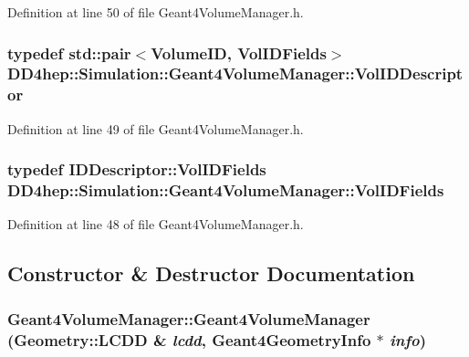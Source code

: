 Definition at line 50 of file Geant4VolumeManager.h.\hypertarget{class_d_d4hep_1_1_simulation_1_1_geant4_volume_manager_aeedd11a516f671331ec2a46f5d39768d}{
\subsubsection[{VolIDDescriptor}]{\setlength{\rightskip}{0pt plus 5cm}typedef std::pair$<$VolumeID, {\bf VolIDFields}$>$ {\bf DD4hep::Simulation::Geant4VolumeManager::VolIDDescriptor}}}
\label{class_d_d4hep_1_1_simulation_1_1_geant4_volume_manager_aeedd11a516f671331ec2a46f5d39768d}


Definition at line 49 of file Geant4VolumeManager.h.\hypertarget{class_d_d4hep_1_1_simulation_1_1_geant4_volume_manager_ae80cafd25a138d7c91c24cda4bc350b1}{
\subsubsection[{VolIDFields}]{\setlength{\rightskip}{0pt plus 5cm}typedef {\bf IDDescriptor::VolIDFields} {\bf DD4hep::Simulation::Geant4VolumeManager::VolIDFields}}}
\label{class_d_d4hep_1_1_simulation_1_1_geant4_volume_manager_ae80cafd25a138d7c91c24cda4bc350b1}


Definition at line 48 of file Geant4VolumeManager.h.

\subsection{Constructor \& Destructor Documentation}
\hypertarget{class_d_d4hep_1_1_simulation_1_1_geant4_volume_manager_a4e434e1e81dec955ac925c4bb26cb420}{
\subsubsection[{Geant4VolumeManager}]{\setlength{\rightskip}{0pt plus 5cm}Geant4VolumeManager::Geant4VolumeManager ({\bf Geometry::LCDD} \& {\em lcdd}, \/  {\bf Geant4GeometryInfo} $\ast$ {\em info})}}
\label{class_d_d4hep_1_1_simulation_1_1_geant4_volume_manager_a4e434e1e81dec955ac925c4bb26cb420}


